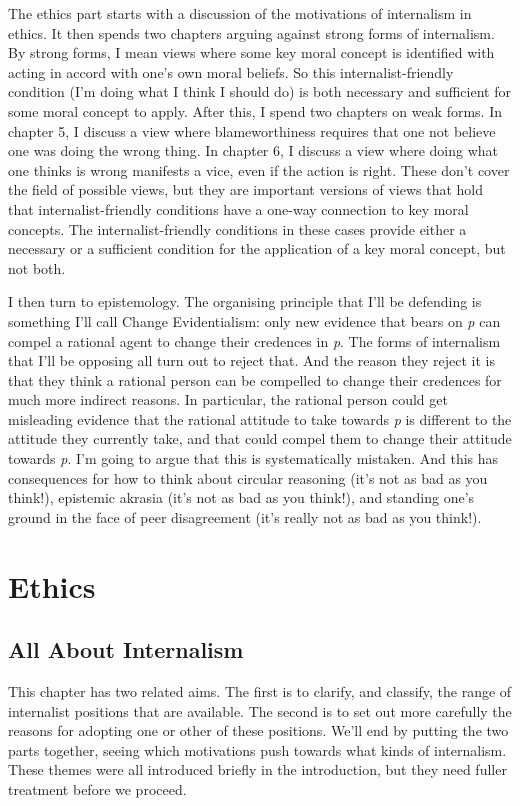\documentclass[
  10pt,
  letterpaper,
  twoside]{scrbook}
\begin{document}
The ethics part starts with a discussion of the motivations of
internalism in ethics. It then spends two chapters arguing against
strong forms of internalism. By strong forms, I mean views where some
key moral concept is identified with acting in accord with one's own
moral beliefs. So this internalist-friendly condition (I'm doing what I
think I should do) is both necessary and sufficient for some moral
concept to apply. After this, I spend two chapters on weak forms. In
chapter 5, I discuss a view where blameworthiness requires that one not
believe one was doing the wrong thing. In chapter 6, I discuss a view
where doing what one thinks is wrong manifests a vice, even if the
action is right. These don't cover the field of possible views, but they
are important versions of views that hold that internalist-friendly
conditions have a one-way connection to key moral concepts. The
internalist-friendly conditions in these cases provide either a
necessary or a sufficient condition for the application of a key moral
concept, but not both.

I then turn to epistemology. The organising principle that I'll be
defending is something I'll call Change Evidentialism: only new evidence
that bears on \emph{p} can compel a rational agent to change their
credences in \emph{p}. The forms of internalism that I'll be opposing
all turn out to reject that. And the reason they reject it is that they
think a rational person can be compelled to change their credences for
much more indirect reasons. In particular, the rational person could get
misleading evidence that the rational attitude to take towards \emph{p}
is different to the attitude they currently take, and that could compel
them to change their attitude towards \emph{p}. I'm going to argue that
this is systematically mistaken. And this has consequences for how to
think about circular reasoning (it's not as bad as you think!),
epistemic akrasia (it's not as bad as you think!), and standing one's
ground in the face of peer disagreement (it's really not as bad as you
think!).

\part{Ethics}

\chapter{All About Internalism}\label{allaboutinternalism}

This chapter has two related aims. The first is to clarify, and
classify, the range of internalist positions that are available. The
second is to set out more carefully the reasons for adopting one or
other of these positions. We'll end by putting the two parts together,
seeing which motivations push towards what kinds of internalism. These
themes were all introduced briefly in the introduction, but they need
fuller treatment before we proceed.
\end{document}
